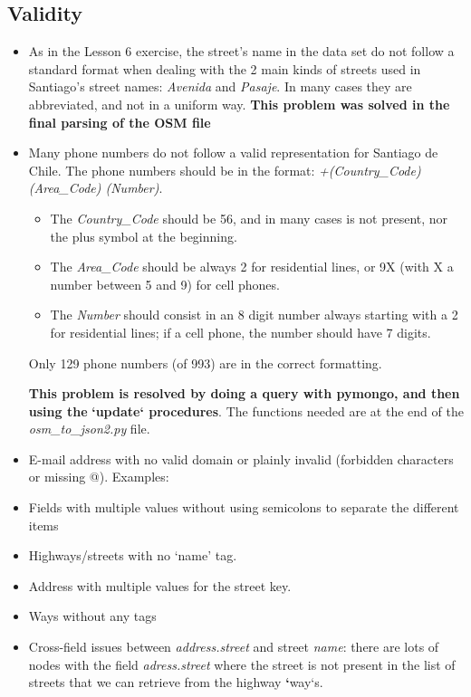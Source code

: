 \documentclass[a4paper,10pt,english]{sphinxhowto}
\begin{document}
\subsection{Validity}
\label{index:validity}\begin{itemize}
\item {} 
As in the Lesson 6 exercise, the street's name in the data set do not follow
a standard format when dealing with the 2 main kinds of streets used in Santiago's
street names: \emph{Avenida} and \emph{Pasaje}. In many cases they are abbreviated, and not
in a uniform way. \textbf{This problem was solved in the final parsing of the OSM file}

\item {} 
Many phone numbers do not follow a valid representation for Santiago de Chile.
The phone numbers should be in the format: \emph{+(Country\_Code) (Area\_Code) (Number)}.
\begin{itemize}
\item {} 
The \emph{Country\_Code} should be 56, and in many cases is not present, nor the plus
symbol at the beginning.

\item {} 
The \emph{Area\_Code} should be always 2 for residential lines, or 9X (with X a
number between 5 and 9) for cell phones.

\item {} 
The \emph{Number} should consist in an 8 digit number always starting with a 2
for residential lines; if a cell phone, the number should have 7 digits.

\end{itemize}

Only 129 phone numbers (of 993) are in the correct formatting.

\textbf{This problem is resolved by doing a query with pymongo, and then using the}
\textbf{{}`update{}` procedures}. The functions needed are at the end of the \emph{osm\_to\_json2.py} file.

\item {} 
E-mail address with no valid domain or plainly invalid (forbidden characters or
missing @). Examples:

\item {} 
Fields with multiple values without using semicolons to separate the different
items

\item {} 
Highways/streets with no `name' tag.

\item {} 
Address with multiple values for the street key.

\item {} 
Ways without any tags

\item {} 
Cross-field issues between \emph{address.street} and street \emph{name}: there are lots
of nodes with the field \emph{adress.street} where the street is not present in the
list of streets that we can retrieve from the highway {\color{red}\bfseries{}{}`}way{}`s.

\end{itemize}
\end{document}
